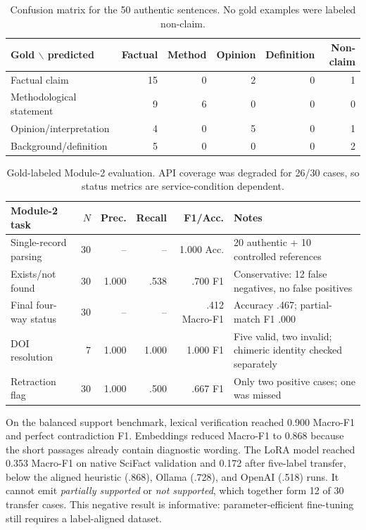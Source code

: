 \documentclass[12pt,toc=bib,toc=listof]{scrartcl}
\begin{document}
\begin{table}[H]
\centering
\scriptsize
\begin{tabular}{@{}lrrrrr@{}}
\toprule
\textbf{Gold $\backslash$ predicted} & \textbf{Factual} & \textbf{Method} & \textbf{Opinion} & \textbf{Definition} & \textbf{Non-claim} \\
\midrule
Factual claim & 15 & 0 & 2 & 0 & 1 \\
Methodological statement & 9 & 6 & 0 & 0 & 0 \\
Opinion/interpretation & 4 & 0 & 5 & 0 & 1 \\
Background/definition & 5 & 0 & 0 & 0 & 2 \\
\bottomrule
\end{tabular}
\caption{Confusion matrix for the 50 authentic sentences. No gold examples were labeled non-claim.}
\label{tab:claim_confusion}
\end{table}

\begin{table}[H]
\centering
\scriptsize
\begin{tabularx}{\textwidth}{@{}P{2.25cm}r r r r Y@{}}
\toprule
\textbf{Module-2 task} & $N$ & \textbf{Prec.} & \textbf{Recall} & \textbf{F1/Acc.} & \textbf{Notes} \\
\midrule
Single-record parsing & 30 & -- & -- & 1.000 Acc. & 20 authentic + 10 controlled references \\
Exists/not found & 30 & 1.000 & .538 & .700 F1 & Conservative: 12 false negatives, no false positives \\
Final four-way status & 30 & -- & -- & .412 Macro-F1 & Accuracy .467; partial-match F1 .000 \\
DOI resolution & 7 & 1.000 & 1.000 & 1.000 F1 & Five valid, two invalid; chimeric identity checked separately \\
Retraction flag & 30 & 1.000 & .500 & .667 F1 & Only two positive cases; one was missed \\
\bottomrule
\end{tabularx}
\caption{Gold-labeled Module-2 evaluation. API coverage was degraded for 26/30 cases, so status metrics are service-condition dependent.}
\label{tab:module2_status}
\end{table}

On the balanced support benchmark, lexical verification reached 0.900 Macro-F1 and perfect contradiction F1. Embeddings reduced Macro-F1 to 0.868 because the short passages already contain diagnostic wording. The LoRA model reached 0.353 Macro-F1 on native SciFact validation and 0.172 after five-label transfer, below the aligned heuristic (.868), Ollama (.728), and OpenAI (.518) runs. It cannot emit \emph{partially supported} or \emph{not supported}, which together form 12 of 30 transfer cases. This negative result is informative: parameter-efficient fine-tuning still requires a label-aligned dataset.
\end{document}
